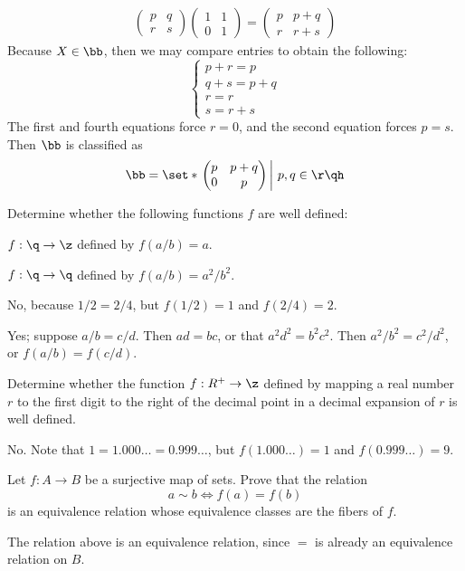 \begin{problems}
\begin{sol}
\begin{align*}
\begin{pmatrix}
                p & q \\
                r & s
            \end{pmatrix}
            \begin{pmatrix}
                1 & 1 \\
                0 & 1
            \end{pmatrix} = 
            \begin{pmatrix}
                p & p + q \\
                r & r + s
            \end{pmatrix}
        \end{align*}
        Because $X \in \bb$, then we may compare entries to obtain the following:
        \[
        \begin{cases}
            p + r = p \\
            q + s = p + q \\
            r = r \\
            s = r + s
        \end{cases}
        \]
        The first and fourth equations force $r = 0$, and the second equation forces $p = s$. Then $\bb$ is classified as
        \[\bb = \set*{\left.
        \begin{pmatrix}
            p & p + q \\
            0 & p
        \end{pmatrix}\,\right|\, p, q \in \r} \qh\]
    \end{sol}
    \item Determine whether the following functions $f$ are well defined:
    \begin{problems}
        \item $f : \q \to \z$ defined by $f(a/b) = a$.
        \item $f : \q \to \q$ defined by $f(a/b) = a^2/b^2$.
    \end{problems}
    \begin{solalph}
        \item No, because $1/2 = 2/4$, but $f(1/2) = 1$ and $f(2/4) = 2$.
        \item Yes; suppose $a/b = c/d$. Then $ad = bc$, or that $a^2d^2 = b^2c^2$. Then $a^2/b^2 = c^2/d^2$, or $f(a/b) = f(c/d)$. 
    \end{solalph}
    \item Determine whether the function $f: R^+ \to \z$ defined by mapping a real number $r$ to the first digit to the right of the decimal point in a decimal expansion of $r$ is well defined.
    \begin{sol}
        No. Note that $1=1.000\ldots = 0.999\ldots$, but $f(1.000\ldots) = 1$ and $f(0.999\ldots) = 9$.
    \end{sol}
    \item Let $f: A \to B$ be a surjective map of sets. Prove that the relation
    $$a \sim b \iff f(a) = f(b)$$
    is an equivalence relation whose equivalence classes are the fibers of $f$.
    \begin{sol}
        The relation above is an equivalence relation, since $=$ is already an equivalence relation on $B$.
        

\end{sol}
\end{problems}
